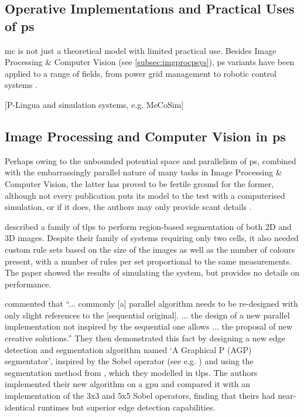 \subsection{\label{sec:psystemsuses}Operative Implementations and Practical Uses of \texorpdfstring{\gls{ps}}{P systems}}
\Gls{mc} is not just a theoretical model with limited practical use.  Besides Image Processing \& Computer Vision (see \autoref{subsec:imgprocpsys}), \gls{ps} variants have been applied to a range of fields, from power grid management to robotic control systems \cite{Zhang2017}.

[P-Lingua and simulation systems, e.g. MeCoSim]

\subsection{\label{subsec:imgprocpsys}Image Processing and Computer Vision in \texorpdfstring{\gls{ps}}{P systems}}

Perhaps owing to the unbounded potential space and parallelism of \gls{ps}, combined with the embarrassingly parallel nature of many tasks in Image Processing \& Computer Vision, the latter has proved to be fertile ground for the former, although not every publication puts its model to the test with a computerised simulation, or if it does, the authors may only provide scant details \cite{Diaz-Pernil2019}.

\citeauthor{Christinal2011} \cite{Christinal2011} described a family of \gls{tlps} to perform region-based segmentation of both 2D and 3D images.  Despite their family of systems requiring only two cells, it also needed custom rule sets based on the size of the images as well as the number of colours present, with a number of rules per set proportional to the same measurements.  The paper showed the results of simulating the system, but provides no details on performance.

\citeauthor{Diaz-Pernil2013} \cite{Diaz-Pernil2013} commented that ``... commonly [a] parallel algorithm needs to be re-designed with only slight references to the [sequential original].  ... the design of a new parallel implementation not inspired by the sequential one allows ... the proposal of new creative solutions.''  They then demonstrated this fact by designing a new edge detection and segmentation algorithm named `A Graphical P (AGP) segmentator', inspired by the Sobel operator (see e.g. \cite{Nixon2012}) and using the segmentation method from \cite{Christinal2011}, which they modelled in \gls{tlps}.  The authors implemented their new algorithm on a \gls{gpu} and compared it with an implementation of the 3x3 and 5x5 Sobel operators, finding that theirs had near-identical runtimes but superior edge detection capabilities.

